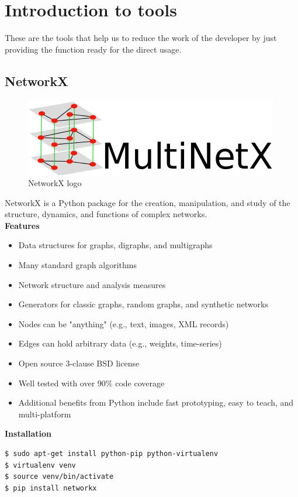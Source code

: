 \section{Introduction to tools}
These are the tools that help us to reduce the work of the developer by just providing the function ready for the direct usage. 
\subsection{NetworkX}

\begin{figure}[h]
\centering \includegraphics[scale=0.5]{input/images/networkx.png}
\caption{NetworkX logo}
\end{figure}

NetworkX is a Python package for the creation, manipulation, and study of the structure, dynamics, and functions of complex networks.\\

  
{\bf Features}
\begin{itemize}
    \item Data structures for graphs, digraphs, and multigraphs
    \item Many standard graph algorithms
    \item Network structure and analysis measures
    \item Generators for classic graphs, random graphs, and synthetic networks
    \item Nodes can be "anything" (e.g., text, images, XML records)
    \item Edges can hold arbitrary data (e.g., weights, time-series)
    \item Open source 3-clause BSD license
    \item Well tested with over 90\% code coverage
    \item Additional benefits from Python include fast prototyping, easy to teach, and multi-platform
\end{itemize}

{\bf Installation}
\begin{verbatim}
$ sudo apt-get install python-pip python-virtualenv
$ virtualenv venv
$ source venv/bin/activate
$ pip install networkx
\end{verbatim}

